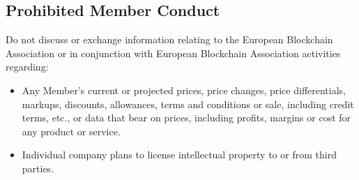 \documentclass{article}
\begin{document}
\subsection{Prohibited Member Conduct}

Do not discuss or exchange information relating to the European Blockchain Association or in conjunction with European Blockchain Association activities regarding:

\begin{itemize}
	\item Any Member's current or projected prices, price changes, price differentials, markups, discounts, allowances, terms and conditions or sale, including credit terms, etc., or data that bear on prices, including profits, margins or cost for any product or service.
	\item Individual company plans to license intellectual property to or from third parties.
\end{itemize}
\end{document}
